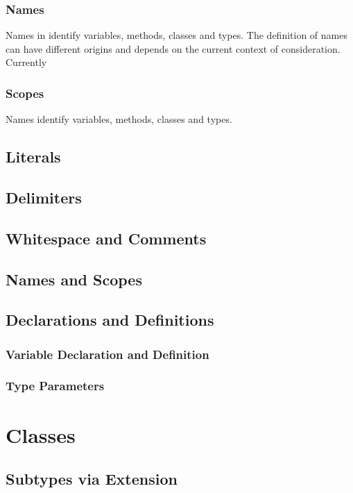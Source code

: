 \subsection{Names}
Names in \ooplss identify variables, methods, classes and types. The definition of names can have different origins and depends on the current context of consideration. Currently 

\subsection{Scopes}
Names identify variables, methods, classes and types. 

\section{Literals}

\section{Delimiters}

\section{Whitespace and Comments}

\section{Names and Scopes}


\section{Declarations and Definitions}
\subsection{Variable Declaration and Definition}
\subsection{Type Parameters}

\chapter{Classes}
\section{Subtypes via Extension}
